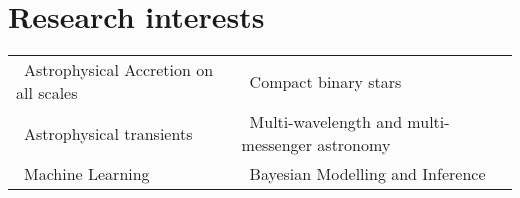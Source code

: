 \documentclass{article}
\newcommand{\tb}{\textbullet}
\newcommand{\saao}{\gls*{saao}\xspace}
\begin{document}
% 
%  
%  
%  
  


\section{Research interests} 

\begin{tabular}{l l}
  \tb \ Astrophysical Accretion on all scales & \tb \ Compact binary stars \\
  \tb \ Astrophysical transients              & \tb \ Multi-wavelength and multi-messenger astronomy \\
  \tb \ Machine Learning                      & \tb \ Bayesian Modelling and Inference \\
\end{tabular}
\end{document}
